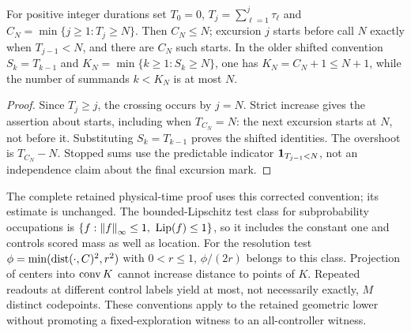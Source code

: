 \begin{lemma}\label{lem:crossing-new}
For positive integer durations set $T_0=0$, $T_j=\sum_{\ell=1}^j\tau_\ell$ and
$C_N=\min\{j\ge1:T_j\ge N\}$. Then $C_N\le N$; excursion $j$ starts before call $N$ exactly when $T_{j-1}<N$, and there are $C_N$ such starts. In the older shifted convention $S_k=T_{k-1}$ and $K_N=\min\{k\ge1:S_k\ge N\}$, one has $K_N=C_N+1\le N+1$, while the number of summands $k<K_N$ is at most $N$.
\end{lemma}
\begin{proof}
Since $T_j\ge j$, the crossing occurs by $j=N$. Strict increase gives the assertion about starts, including when $T_{C_N}=N$: the next excursion starts at $N$, not before it. Substituting $S_k=T_{k-1}$ proves the shifted identities. The overshoot is $T_{C_N}-N$. Stopped sums use the predictable indicator $\mathbf 1_{T_{j-1}<N}$, not an independence claim about the final excursion mark.
\end{proof}
The complete retained physical-time proof uses this corrected convention; its estimate is unchanged. The bounded-Lipschitz test class for subprobability occupations is
$\{f:\left\lVert f\right\rVert_\infty\le1,\ \operatorname{Lip}(f)\le1\}$, so it includes the constant one and controls scored mass as well as location. For the resolution test $\phi=\min(\operatorname{dist}(\cdot,C)^2,r^2)$ with $0<r\le1$, $\phi/(2r)$ belongs to this class. Projection of centers into $\operatorname{conv} K$ cannot increase distance to points of $K$. Repeated readouts at different control labels yield at most, not necessarily exactly, $M$ distinct codepoints. These conventions apply to the retained geometric lower without promoting a fixed-exploration witness to an all-controller witness.
